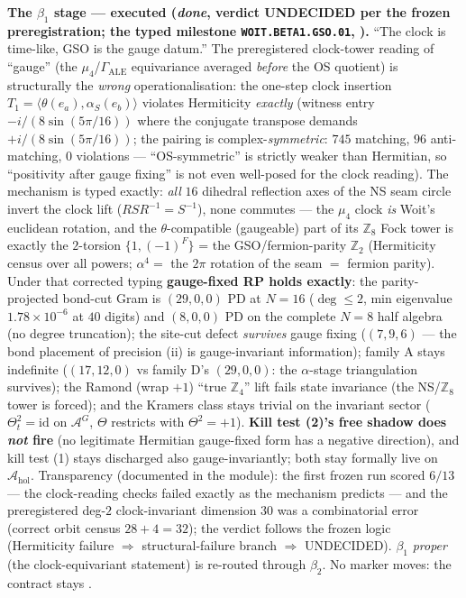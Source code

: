 \documentclass[11pt,a4paper]{article}
\newcommand{\Z}{\mathbb Z}
\begin{document}
\par\smallskip\noindent\textbf{The $\beta_1$ stage --- executed (\emph{done}, verdict UNDECIDED
per the frozen preregistration; the typed milestone \texttt{WOIT.BETA1.GSO.01},
).} ``The clock is time-like, GSO is the gauge datum.''
The preregistered clock-tower reading of ``gauge'' (the $\mu_4$/$\Gamma_{\mathrm{ALE}}$
equivariance averaged \emph{before} the OS quotient) is structurally the \emph{wrong}
operationalisation: the one-step clock insertion
$T_1=\langle\theta(e_a),\alpha_S(e_b)\rangle$ violates Hermiticity \emph{exactly} (witness
entry $-i/(8\sin(5\pi/16))$ where the conjugate transpose demands $+i/(8\sin(5\pi/16))$; the
pairing is complex-\emph{symmetric}: $745$ matching, $96$ anti-matching, $0$ violations ---
``OS-symmetric'' is strictly weaker than Hermitian, so ``positivity after gauge fixing'' is
not even well-posed for the clock reading). The mechanism is typed exactly: \emph{all} $16$
dihedral reflection axes of the NS seam circle invert the clock lift ($RSR^{-1}=S^{-1}$), none
commutes --- the $\mu_4$ clock \emph{is} Woit's euclidean rotation, and the $\theta$-compatible
(gaugeable) part of its $\Z_8$ Fock tower is exactly the $2$-torsion $\{1,(-1)^F\}$ = the
GSO/fermion-parity $\Z_2$ (Hermiticity census over all powers; $\alpha^4=$ the $2\pi$ rotation
of the seam $=$ fermion parity). Under that corrected typing \textbf{gauge-fixed RP holds
exactly}: the parity-projected bond-cut Gram is $(29,0,0)$ PD at $N=16$ ($\deg\le2$, min
eigenvalue $1.78\times10^{-6}$ at $40$ digits) and $(8,0,0)$ PD on the complete $N=8$ half
algebra (no degree truncation); the site-cut defect \emph{survives} gauge fixing ($(7,9,6)$ ---
the bond placement of precision (ii) is gauge-invariant information); family A stays indefinite
($(17,12,0)$ vs family D's $(29,0,0)$: the $\alpha$-stage triangulation survives); the Ramond
(wrap $+1$) ``true $\Z_4$'' lift fails state invariance (the NS/$\Z_8$ tower is forced); and
the Kramers class stays trivial on the invariant sector ($\Theta_t^2=\mathrm{id}$ on
$\mathcal A^G$, $\Theta$ restricts with $\Theta^2=+1$). \textbf{Kill test (2)'s free shadow
does \emph{not} fire} (no legitimate Hermitian gauge-fixed form has a negative direction), and
kill test (1) stays discharged also gauge-invariantly; both stay formally live on
$\mathcal A_{\mathrm{hol}}$. Transparency (documented in the module): the first frozen run
scored $6/13$ --- the clock-reading checks failed exactly as the mechanism predicts --- and
the preregistered deg-$2$ clock-invariant dimension $30$ was a combinatorial error (correct
orbit census $28+4=32$); the verdict follows the frozen logic (Hermiticity failure
$\Rightarrow$ structural-failure branch $\Rightarrow$ UNDECIDED). $\beta_1$ \emph{proper}
(the clock-equivariant statement) is re-routed through $\beta_2$. No marker moves: the
contract stays \mO.
\end{document}
